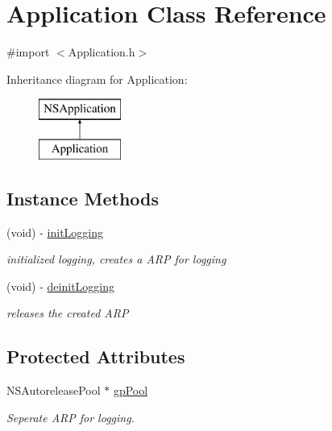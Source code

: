 \hypertarget{interface_application}{\section{Application Class Reference}
\label{interface_application}
}


{\ttfamily \#import $<$Application.\-h$>$}

Inheritance diagram for Application\-:\begin{figure}[H]
\begin{center}
\leavevmode
\includegraphics[height=2.000000cm]{interface_application}
\end{center}
\end{figure}
\subsection*{Instance Methods}
\begin{DoxyCompactItemize}
\item 
(void) -\/ \hyperlink{interface_application_a5d0717fdf14f6c5bb900de985d2d653a}{init\-Logging}
\begin{DoxyCompactList}\small\item\em initialized logging, creates a A\-R\-P for logging \end{DoxyCompactList}\item 
(void) -\/ \hyperlink{interface_application_a402368240177f93e795c0848af332c60}{deinit\-Logging}
\begin{DoxyCompactList}\small\item\em releases the created A\-R\-P \end{DoxyCompactList}\end{DoxyCompactItemize}
\subsection*{Protected Attributes}
\begin{DoxyCompactItemize}
\item 
N\-S\-Autorelease\-Pool $\ast$ \hyperlink{interface_application_a4c63f1e378cd7d37030f34b667510648}{gp\-Pool}
\begin{DoxyCompactList}\small\item\em Seperate A\-R\-P for logging. \end{DoxyCompactList}\end{DoxyCompactItemize}


